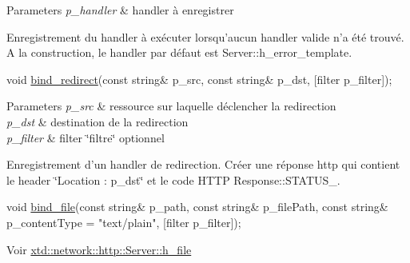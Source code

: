 \begin{DoxyItemize}
\begin{DoxyParams}{Parameters}
{\em p\-\_\-handler} & handler à enregistrer\\
\hline
\end{DoxyParams}
Enregistrement du handler à exécuter lorsqu'aucun handler valide n'a été trouvé. A la construction, le handler par défaut est Server\-::h\-\_\-error\-\_\-template. \par
\par

\item 
\begin{DoxyCode}
\textcolor{keywordtype}{void} \hyperlink{classxtd_1_1network_1_1http_1_1Server_a4eed9eec0caf2f786f45e07161512cad}{bind\_redirect}(\textcolor{keyword}{const} \textcolor{keywordtype}{string}& p\_src, \textcolor{keyword}{const} \textcolor{keywordtype}{string}& p\_dst, [filter p\_filter]); 
\end{DoxyCode}
 \par
\par
 
\begin{DoxyParams}{Parameters}
{\em p\-\_\-src} & ressource sur laquelle déclencher la redirection \\
\hline
{\em p\-\_\-dst} & destination de la redirection \\
\hline
{\em p\-\_\-filter} & filter \char`\"{}filtre\char`\"{} optionnel\\
\hline
\end{DoxyParams}
Enregistrement d'un handler de redirection. Créer une réponse http qui contient le header \char`\"{}\-Location \-: p\-\_\-dst\char`\"{} et le code H\-T\-T\-P Response\-::\-S\-T\-A\-T\-U\-S\-\_. \par
\par

\item 
\begin{DoxyCode}
\textcolor{keywordtype}{void} \hyperlink{classxtd_1_1network_1_1http_1_1Server_a20602f089753d9aa01e389730d7c38fa}{bind\_file}(\textcolor{keyword}{const} \textcolor{keywordtype}{string}& p\_path,
               \textcolor{keyword}{const} \textcolor{keywordtype}{string}& p\_filePath,
               \textcolor{keyword}{const} \textcolor{keywordtype}{string}& p\_contentType = \textcolor{stringliteral}{"text/plain"},
               [filter            p\_filter]);
\end{DoxyCode}
 \par
\par
 Voir \hyperlink{classxtd_1_1network_1_1http_1_1Server_a4358a20d2246a84f67d299f385c5bce8}{xtd\-::network\-::http\-::\-Server\-::h\-\_\-file} \par
\par


\end{DoxyItemize}
